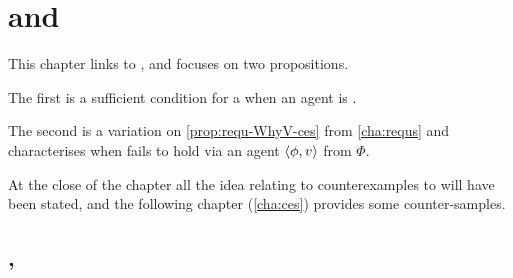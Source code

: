 \chapter{ and }
\label{sec:typicalRequs}


\begin{note}
  This chapter links \tC{} to \requ{}, and focuses on two propositions.

  The first is a sufficient condition for a \requ{} when an agent is \tC{}.

  The second is a variation on \autoref{prop:requ-WhyV-ces} from \autoref{cha:requs} and characterises when \issueConstraint{} fails to hold via an agent \tCV{} \(\langle \phi, v \rangle\) from \(\Phi\).
\end{note}


\begin{note}
  At the close of the chapter all the idea relating to counterexamples to \issueConstraint{} will have been stated, and the following chapter (\autoref{cha:ces}) provides some counter-samples.
\end{note}



\section{, }
\label{sec:tc2-requ1}


